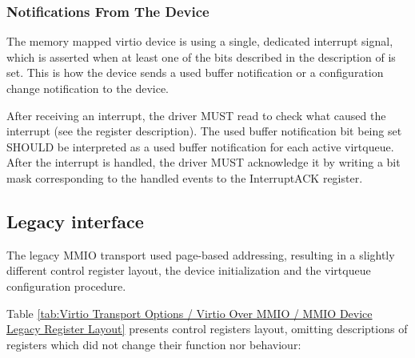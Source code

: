 \subsubsection{Notifications From The Device}\label{sec:Virtio Transport Options / Virtio Over MMIO / MMIO-specific Initialization And Device Operation / Notifications From The Device}

The memory mapped virtio device is using a single, dedicated
interrupt signal, which is asserted when at least one of the
bits described in the description of 
is set. This is how the device sends a used buffer notification
or a configuration change notification to the device.

After receiving an interrupt, the driver MUST read
 to check what caused the interrupt (see the
register description).  The used buffer notification bit being set
SHOULD be interpreted as a used buffer notification for each active
virtqueue.  After the interrupt is handled, the driver MUST acknowledge
it by writing a bit mask corresponding to the handled events to the
InterruptACK register.

\subsection{Legacy interface}\label{sec:Virtio Transport Options / Virtio Over MMIO / Legacy interface}

The legacy MMIO transport used page-based addressing, resulting
in a slightly different control register layout, the device
initialization and the virtqueue configuration procedure.

Table \ref{tab:Virtio Transport Options / Virtio Over MMIO / MMIO Device Legacy Register Layout}
presents control registers layout, omitting
descriptions of registers which did not change their function
nor behaviour:

